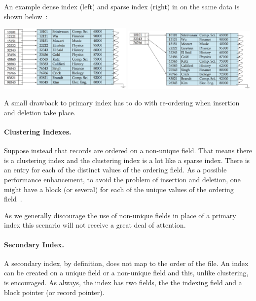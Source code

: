 An example dense index (left) and sparse index (right) in on the same data is shown below~\cite{fds}:

\begin{center}
\includegraphics[width=0.49\textwidth]{images/dense-index}
\includegraphics[width=0.49\textwidth]{images/sparse-index}
\end{center}


A small drawback to primary index has to do with re-ordering when insertion and deletion take place. 

\paragraph{Clustering Indexes.}
Suppose instead that records are ordered on a non-unique field. That means there is a clustering index and the clustering index is a lot like a sparse index. There is an entry for each of the distinct values of the ordering field. As a possible performance enhancement, to avoid the problem of insertion and deletion, one might have a block (or several) for each of the unique values of the ordering field~\cite{fds}.

As we generally discourage the use of non-unique fields in place of a primary index this scenario will not receive a great deal of attention.

\paragraph{Secondary Index.}

A secondary index, by definition, does not map to the order of the file. An index can be created on a unique field or a non-unique field and this, unlike clustering, is encouraged. As always, the index has two fields, the the indexing field and a block pointer (or record pointer). 

